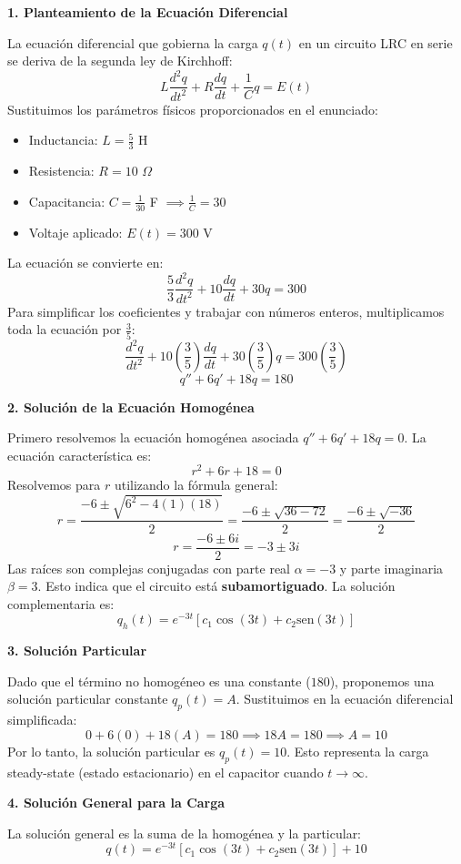 \documentclass[a4paper]{article}
\begin{document}
\textbf{1. Planteamiento de la Ecuación Diferencial}

La ecuación diferencial que gobierna la carga $q(t)$ en un circuito LRC en serie se deriva de la segunda ley de Kirchhoff:
$$
L\frac{d^2q}{dt^2} + R\frac{dq}{dt} + \frac{1}{C}q = E(t)
$$
Sustituimos los parámetros físicos proporcionados en el enunciado:
\begin{itemize}
    \item Inductancia: $L = \frac{5}{3}$ H
    \item Resistencia: $R = 10$ $\Omega$
    \item Capacitancia: $C = \frac{1}{30}$ F $\implies \frac{1}{C} = 30$
    \item Voltaje aplicado: $E(t) = 300$ V
\end{itemize}

La ecuación se convierte en:
$$
\frac{5}{3}\frac{d^2q}{dt^2} + 10\frac{dq}{dt} + 30q = 300
$$
Para simplificar los coeficientes y trabajar con números enteros, multiplicamos toda la ecuación por $\frac{3}{5}$:
$$
\frac{d^2q}{dt^2} + 10\left(\frac{3}{5}\right)\frac{dq}{dt} + 30\left(\frac{3}{5}\right)q = 300\left(\frac{3}{5}\right)
$$
$$
q'' + 6q' + 18q = 180
$$

\textbf{2. Solución de la Ecuación Homogénea}

Primero resolvemos la ecuación homogénea asociada $q'' + 6q' + 18q = 0$. La ecuación característica es:
$$
r^2 + 6r + 18 = 0
$$
Resolvemos para $r$ utilizando la fórmula general:
$$
r = \frac{-6 \pm \sqrt{6^2 - 4(1)(18)}}{2} = \frac{-6 \pm \sqrt{36 - 72}}{2} = \frac{-6 \pm \sqrt{-36}}{2}
$$
$$
r = \frac{-6 \pm 6i}{2} = -3 \pm 3i
$$
Las raíces son complejas conjugadas con parte real $\alpha = -3$ y parte imaginaria $\beta = 3$. Esto indica que el circuito está \textbf{subamortiguado}. La solución complementaria es:
$$
q_h(t) = e^{-3t} [c_1 \cos(3t) + c_2 \text{sen}(3t)]
$$

\textbf{3. Solución Particular}

Dado que el término no homogéneo es una constante ($180$), proponemos una solución particular constante $q_p(t) = A$. Sustituimos en la ecuación diferencial simplificada:
$$
0 + 6(0) + 18(A) = 180 \implies 18A = 180 \implies A = 10
$$
Por lo tanto, la solución particular es $q_p(t) = 10$. Esto representa la carga steady-state (estado estacionario) en el capacitor cuando $t \to \infty$.

\textbf{4. Solución General para la Carga}

La solución general es la suma de la homogénea y la particular:
$$
q(t) = e^{-3t} [c_1 \cos(3t) + c_2 \text{sen}(3t)] + 10
$$
\end{document}

